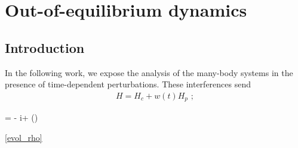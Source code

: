\chapter{Out-of-equilibrium dynamics}

%
\section{Introduction}

In the following work, we expose the analysis of the many-body systems in the presence of time-dependent perturbations. These interferences send 
\begin{align}
	\label{Hmany-body}
	H = H_c + w(t) H_p \,\,;
\end{align}

	 = - i + (\rho) \pt
\ee


\cite{TV-21}
\ref{evol_rho}










